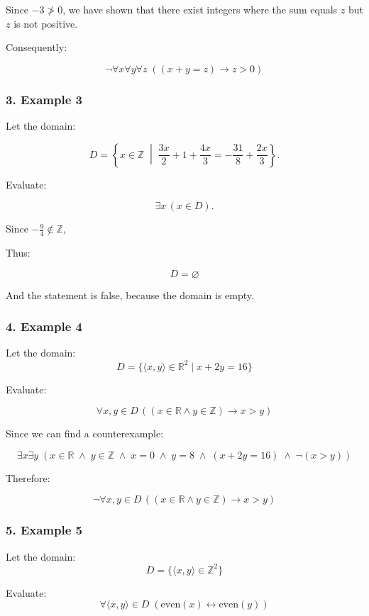Since \(-3 \not> 0\), we have shown that there exist integers where the
sum equals \(z\) but \(z\) is not positive.

Consequently:

\[\boxed{\neg \forall x \forall y \forall z \;((x + y = z) \to z > 0)}\]

\subsubsection{3. Example 3}\label{example-3}

Let the domain:

\[
D = \displaystyle\left\{ x \in \mathbb{Z} \;\middle|\; \frac{3x}{2} + 1 + \frac{4x}{3} = -\frac{31}{8} + \frac{2x}{3} \right\}.
\]

Evaluate:

\[
\exists x \,(x \in D).
\]

Since \(-\tfrac{9}{4} \notin \mathbb{Z}\),

Thus:

\[
\boxed{D = \varnothing}
\]

And the statement is false, because the domain is empty.

\subsubsection{4. Example 4}\label{example-4}

Let the domain:
\[D = \{\langle x,y \rangle \in \mathbb{R}^2 \mid x + 2y = 16\} \]

Evaluate:

\[ \forall  x, y \in D \, ((x \in \mathbb{R} \land y \in \mathbb{Z}) \to x > y) \]

Since we can find a counterexample:

\[\exists x \exists y \;(x \in \mathbb{R} \;\land\; y \in \mathbb{Z} \;\land\; x = 0 \;\land\; y = 8 \;\land\; (x + 2y = 16) \;\land\; \neg(x > y))\]

Therefore:

\[\boxed{\neg \forall x, y \in D \, ((x \in \mathbb{R} \land y \in \mathbb{Z}) \to x > y)}\]

\subsubsection{5. Example 5}\label{example-5}

Let the domain: \[D = \{\langle x,y \rangle \in \mathbb{Z}^2\}\]

Evaluate:
\[\forall \langle x,y \rangle \in D \;(\text{even}(x) \leftrightarrow \text{even}(y))\]

